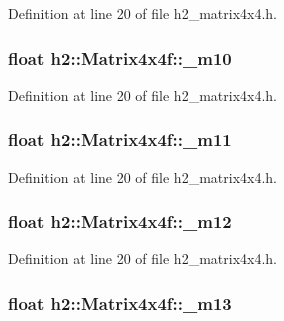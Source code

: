 Definition at line 20 of file h2\-\_\-matrix4x4.\-h.

\hypertarget{classh2_1_1_matrix4x4f_aedefede7327866d61046151d8f9b0eb0}{
\subsubsection[{\-\_\-m10}]{\setlength{\rightskip}{0pt plus 5cm}float h2\-::\-Matrix4x4f\-::\-\_\-m10}}\label{classh2_1_1_matrix4x4f_aedefede7327866d61046151d8f9b0eb0}


Definition at line 20 of file h2\-\_\-matrix4x4.\-h.

\hypertarget{classh2_1_1_matrix4x4f_a140f66bf07b5857881ba3a094ee008db}{
\subsubsection[{\-\_\-m11}]{\setlength{\rightskip}{0pt plus 5cm}float h2\-::\-Matrix4x4f\-::\-\_\-m11}}\label{classh2_1_1_matrix4x4f_a140f66bf07b5857881ba3a094ee008db}


Definition at line 20 of file h2\-\_\-matrix4x4.\-h.

\hypertarget{classh2_1_1_matrix4x4f_a279f6f02edbdd7f62b920693f398ef9f}{
\subsubsection[{\-\_\-m12}]{\setlength{\rightskip}{0pt plus 5cm}float h2\-::\-Matrix4x4f\-::\-\_\-m12}}\label{classh2_1_1_matrix4x4f_a279f6f02edbdd7f62b920693f398ef9f}


Definition at line 20 of file h2\-\_\-matrix4x4.\-h.

\hypertarget{classh2_1_1_matrix4x4f_a9b2d097560beaeaa2a1bbfbc89f6cac1}{
\subsubsection[{\-\_\-m13}]{\setlength{\rightskip}{0pt plus 5cm}float h2\-::\-Matrix4x4f\-::\-\_\-m13}}\label{classh2_1_1_matrix4x4f_a9b2d097560beaeaa2a1bbfbc89f6cac1}


